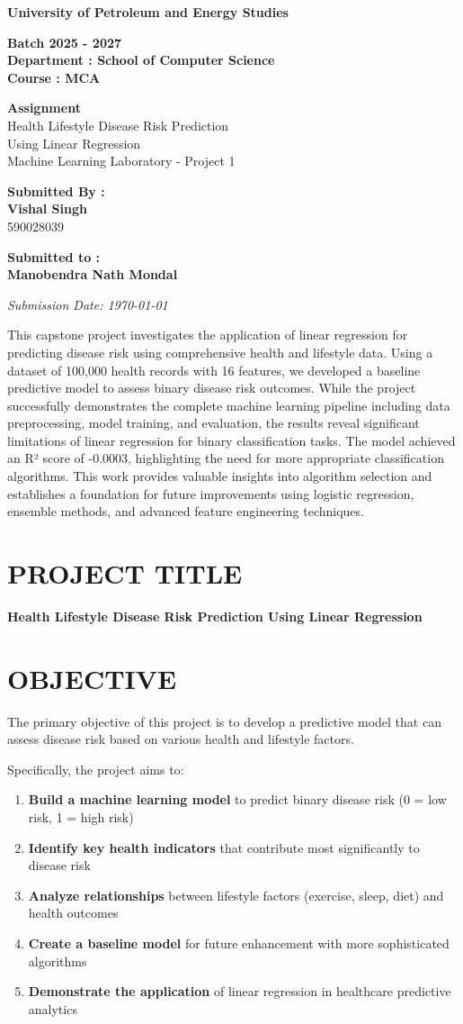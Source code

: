 \documentclass[12pt,a4paper]{article}
\title{}
\author{}
\date{}
\newcommand{\createcustomtitle}{
    \begin{titlepage}
        \centering
        \vspace*{2cm}
        
        {\Huge\bfseries\color{primaryblue} University of Petroleum and Energy Studies}\\[1.5cm]
        
        \vspace{1cm}
        
        {\LARGE\color{darkgray}\textbf{Batch 2025 - 2027}}\\[1cm]
        
        {\large\color{darkgray}\textbf{Department : School of Computer Science}}\\[0.5cm]
        
        {\large\color{darkgray}\textbf{Course : MCA}}\\[2cm]
        
        \begin{tcolorbox}[
            colback=primaryblue!10,
            colframe=primaryblue,
            boxrule=2pt,
            arc=5pt,
            width=0.8\textwidth,
            halign=center
        ]
            {\huge\bfseries\color{primaryblue} Assignment}\\[0.5cm]
            {\Large\color{darkgray} Health Lifestyle Disease Risk Prediction}\\[0.3cm]
            {\large\color{darkgray} Using Linear Regression}\\[0.3cm]
            {\normalsize\color{accentorange} Machine Learning Laboratory - Project 1}
        \end{tcolorbox}
        
        \vspace{2cm}
        
        \begin{minipage}{0.45\textwidth}
            \raggedright
            {\large\textbf{Submitted By :}}\\[0.5cm]
            {\large\textbf{Vishal Singh}}\\[0.3cm]
            {\large 590028039}
        \end{minipage}
        \hfill
        \begin{minipage}{0.45\textwidth}
            \raggedleft
            {\large\textbf{Submitted to :}}\\[0.5cm]
            {\large\textbf{Manobendra Nath Mondal}}
        \end{minipage}
        
        \vspace{\fill}
        
        {\large\textit{Submission Date: \today}}
        
    \end{titlepage}
}
\begin{document}
\createcustomtitle

\vspace{1cm}
\begin{tcolorbox}[
    colback=secondaryblue!10,
    colframe=primaryblue,
    boxrule=1pt,
    arc=3pt,
    title={\textbf{\large Abstract}},
    fonttitle=\bfseries\color{white},
    coltitle=white,
    colbacktitle=primaryblue
]
This capstone project investigates the application of linear regression for predicting disease risk using comprehensive health and lifestyle data. Using a dataset of 100,000 health records with 16 features, we developed a baseline predictive model to assess binary disease risk outcomes. While the project successfully demonstrates the complete machine learning pipeline including data preprocessing, model training, and evaluation, the results reveal significant limitations of linear regression for binary classification tasks. The model achieved an R² score of -0.0003, highlighting the need for more appropriate classification algorithms. This work provides valuable insights into algorithm selection and establishes a foundation for future improvements using logistic regression, ensemble methods, and advanced feature engineering techniques.
\end{tcolorbox}

\newpage

\tableofcontents
\newpage

\section{PROJECT TITLE}
\textbf{Health Lifestyle Disease Risk Prediction Using Linear Regression}

\section{OBJECTIVE}

\begin{objectivebox}
The primary objective of this project is to develop a predictive model that can assess disease risk based on various health and lifestyle factors.
\end{objectivebox}

\vspace{0.5cm}

Specifically, the project aims to:

\begin{enumerate}[leftmargin=1.5em]
    \item \textbf{Build a machine learning model} to predict binary disease risk (0 = low risk, 1 = high risk)
    \item \textbf{Identify key health indicators} that contribute most significantly to disease risk
    \item \textbf{Analyze relationships} between lifestyle factors (exercise, sleep, diet) and health outcomes
    \item \textbf{Create a baseline model} for future enhancement with more sophisticated algorithms
    \item \textbf{Demonstrate the application} of linear regression in healthcare predictive analytics
\end{enumerate}
\end{document}

